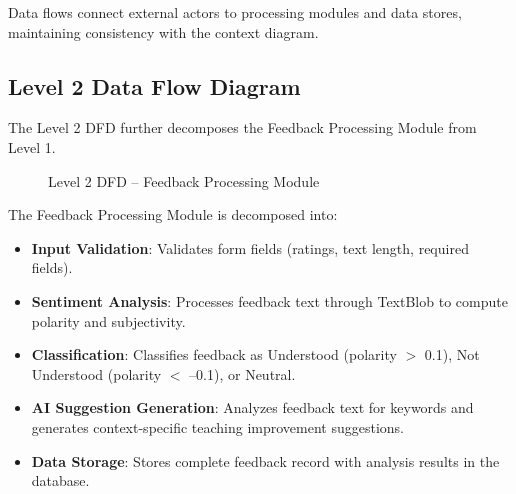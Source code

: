 Data flows connect external actors to processing modules and data stores, maintaining consistency with the context diagram.

\subsection{Level 2 Data Flow Diagram}

The Level 2 DFD further decomposes the Feedback Processing Module from Level 1.

\begin{figure}[H]
\centering
{}
\caption{Level 2 DFD -- Feedback Processing Module}
\label{fig:dfd2}
\end{figure}

The Feedback Processing Module is decomposed into:
\begin{itemize}
    \item \textbf{Input Validation}: Validates form fields (ratings, text length, required fields).
    \item \textbf{Sentiment Analysis}: Processes feedback text through TextBlob to compute polarity and subjectivity.
    \item \textbf{Classification}: Classifies feedback as Understood (polarity $>$ 0.1), Not Understood (polarity $<$ --0.1), or Neutral.
    \item \textbf{AI Suggestion Generation}: Analyzes feedback text for keywords and generates context-specific teaching improvement suggestions.
    \item \textbf{Data Storage}: Stores complete feedback record with analysis results in the database.
\end{itemize}

